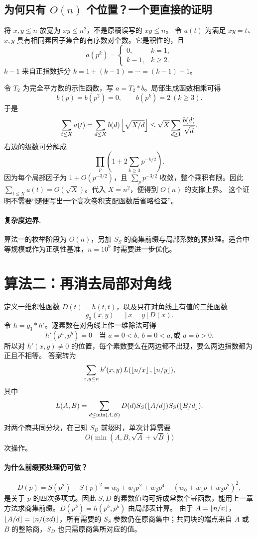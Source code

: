 \subsection{为何只有 \texorpdfstring{$O(n)$}{O(n)} 个位置？一个更直接的证明}
将 $x,y\le n$ 放宽为 $xy\le n^2$，不是原稿误写的 $xy\le n$。
令 $a(t)$ 为满足 $xy=t$、$x,y$ 具有相同素因子集合的有序数对个数。它是积性的，且
\[
 a(p^k)=\begin{cases}0,&k=1,\\k-1,&k\ge2.\end{cases}
\]
$k-1$ 来自正指数拆分 $k=1+(k-1)=\cdots=(k-1)+1$。

令 $T_2$ 为完全平方数的示性函数，写 $a=T_2*b$。局部生成函数相乘可得
\[
 b(p)=b(p^2)=0,\qquad b(p^k)=2\ (k\ge3).
\]
于是
\[
\sum_{t\le X}a(t)=\sum_{d\le X}b(d)\left\lfloor \sqrt{X/d}\right\rfloor
\le\sqrt X\sum_{d\ge1}\frac{b(d)}{\sqrt d}.
\]
右边的级数可分解成
\[
 \prod_p\left(1+2\sum_{k\ge3}p^{-k/2}\right).
\]
因为每个局部因子为 $1+O(p^{-3/2})$，且 $\sum_p p^{-3/2}$ 收敛，整个乘积有限。因此 $\sum_{t\le X}a(t)=O(\sqrt X)$。代入 $X=n^2$，便得到 $O(n)$ 的支撑上界。
这个证明不需要“随便写出一个高次卷积支配函数后省略检查”。

\paragraph{复杂度边界.} 算法一的枚举阶段为 $O(n)$，另加 $S_S$ 的商集前缀与局部系数的预处理。适合中等规模或作为正确性基准，$n=10^9$ 时需要进一步优化。


\section{算法二：再消去局部对角线}
定义一维积性函数 $D(t)=h(t,t)$，以及只在对角线上有值的二维函数
\[
 g_3(x,y)=[x=y]D(x).
\]
令 $h=g_3*h'$。逐素数在对角线上作一维除法可得
\[
 h'(p^a,p^b)=0\quad\text{当 }a=0<b,\ b=0<a,\text{或 }a=b>0.
\]
所以对 $h'(x,y)\ne0$ 的位置，每个素数要么在两边都不出现，要么两边指数都为正且不相等。
答案转为
\[
 \sum_{x,y\le n}h'(x,y)\,L(\left\lfloor n/x\right\rfloor,\left\lfloor n/y\right\rfloor),
\]
其中
\[
 L(A,B)=\sum_{d\le\min(A,B)}D(d)
 S_S(\left\lfloor A/d\right\rfloor)S_S(\left\lfloor B/d\right\rfloor).
\]
对两个商共同分块，在已知 $S_D$ 前缀时，单次计算需要
\[
 O\bigl(\min(A,B,\sqrt A+\sqrt B)\bigr)
\]
次操作。


\paragraph{为什么前缀预处理仍可做？}
\[
 D(p)=S(p^2)-S(p)^2
 =w_0+w_1p^2+w_2p^4-(w_0+w_1p+w_2p^2)^2,
\]
是关于 $p$ 的四次多项式。因此 $S,D$ 的素数值均可拆成常数个幂函数，能用上一章方法求商集前缀。$D(p^k)=h(p^k,p^k)$ 由局部表计算。
由于 $A=\left\lfloor n/x\right\rfloor$，$\left\lfloor A/d\right\rfloor=\left\lfloor n/(xd)\right\rfloor$，所有需要的 $S_S$ 参数仍在原商集中；共同块的端点来自 $A$ 或 $B$ 的整除商，$S_D$ 也只需原商集所对应的值。


